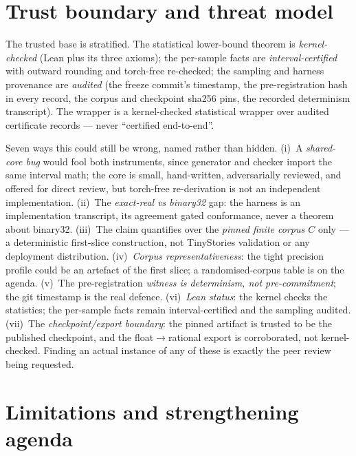 \documentclass[11pt,a4paper]{article}
\begin{document}
\section{Trust boundary and threat model}

The trusted base is stratified. The statistical lower-bound theorem is \emph{kernel-checked} (Lean plus its three axioms); the per-sample facts are \emph{interval-certified} with outward rounding and torch-free re-checked; the sampling and harness provenance are \emph{audited} (the freeze commit's timestamp, the pre-registration hash in every record, the corpus and checkpoint sha256 pins, the recorded determinism transcript). The wrapper is a kernel-checked statistical wrapper over audited certificate records --- never ``certified end-to-end''.

Seven ways this could still be wrong, named rather than hidden. (i)~A \emph{shared-core bug} would fool both instruments, since generator and checker import the same interval math; the core is small, hand-written, adversarially reviewed, and offered for direct review, but torch-free re-derivation is not an independent implementation. (ii)~The \emph{exact-real vs binary32} gap: the harness is an implementation transcript, its agreement gated conformance, never a theorem about binary32. (iii)~The claim quantifies over the \emph{pinned finite corpus \(C\)} only --- a deterministic first-slice construction, not TinyStories validation or any deployment distribution. (iv)~\emph{Corpus representativeness}: the tight precision profile could be an artefact of the first slice; a randomised-corpus table is on the agenda. (v)~The pre-registration \emph{witness is determinism, not pre-commitment}; the git timestamp is the real defence. (vi)~\emph{Lean status}: the kernel checks the statistics; the per-sample facts remain interval-certified and the sampling audited. (vii)~The \emph{checkpoint/export boundary}: the pinned artifact is trusted to be the published checkpoint, and the float\(\to\)rational export is corroborated, not kernel-checked. Finding an actual instance of any of these is exactly the peer review being requested.

\section{Limitations and strengthening agenda}
\end{document}
